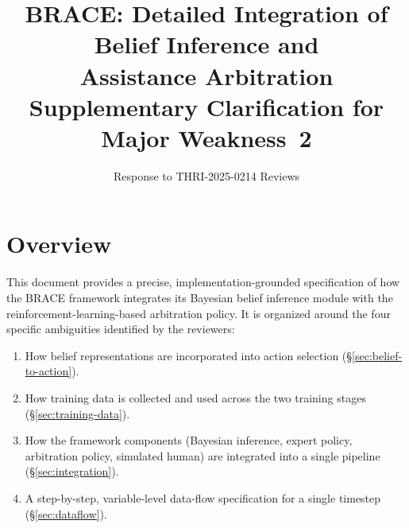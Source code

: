 \documentclass[11pt]{article}
\title{BRACE: Detailed Integration of Belief Inference and \\Assistance Arbitration\\[0.5em]
\large Supplementary Clarification for Major Weakness~2}
\author{Response to THRI-2025-0214 Reviews}
\date{}
\begin{document}
\maketitle
\thispagestyle{empty}

\section{Overview}

This document provides a precise, implementation-grounded specification of how the BRACE framework integrates its Bayesian belief inference module with the reinforcement-learning-based arbitration policy.
It is organized around the four specific ambiguities identified by the reviewers:
\begin{enumerate}
    \item How belief representations are incorporated into action selection (\S\ref{sec:belief-to-action}).
    \item How training data is collected and used across the two training stages (\S\ref{sec:training-data}).
    \item How the framework components (Bayesian inference, expert policy, arbitration policy, simulated human) are integrated into a single pipeline (\S\ref{sec:integration}).
    \item A step-by-step, variable-level data-flow specification for a single timestep (\S\ref{sec:dataflow}).
\end{enumerate}
\end{document}
